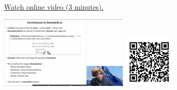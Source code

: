 
\begin{minipage}{10cm}
    \href{https://act4e-spring21.netlify.app/videos/spring2021-enrichment:bounded-lat-en.html}{Watch online video (3 minutes).}
        
    \href{https://act4e-spring21.netlify.app/videos/spring2021-enrichment:bounded-lat-en.html}{\includegraphics[height=3.5cm]{spring2021-enrichment:bounded-lat-en/thumbnails.jpg}}
    \href{https://act4e-spring21.netlify.app/videos/spring2021-enrichment:bounded-lat-en.html}{\includegraphics[height=2.5cm]{spring2021-enrichment:bounded-lat-en/qrcode.png}}
\end{minipage}
